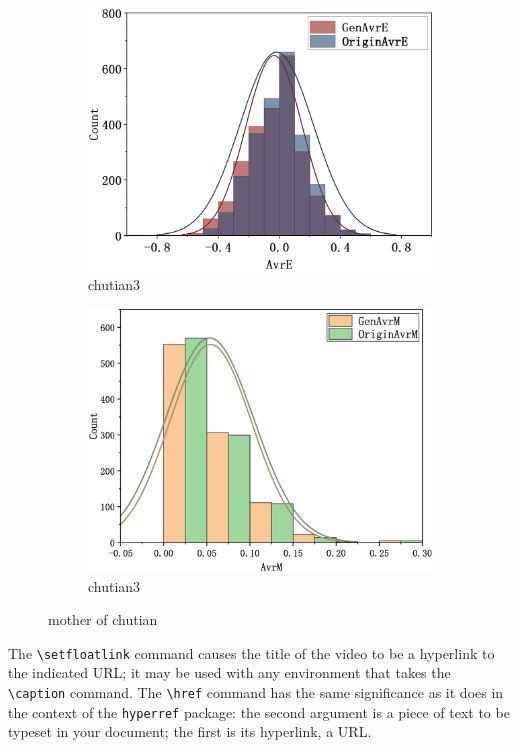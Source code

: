 \documentclass[%
reprint,
amsmath,amssymb,
aps,
]{revtex4-2}
\begin{document}
\begin{figure}[htbp]
\begin{subfigure}{0.4\linewidth}
	\end{subfigure}
	\centering
	\begin{subfigure}{0.4\linewidth}
		\centering
		\includegraphics[scale=0.1]{16mix32_16_T_3_E}
		\caption{chutian3}
		\label{chutian3}%
	\end{subfigure}
	\begin{subfigure}{0.4\linewidth}
		\centering
		\includegraphics[scale=0.1]{16mix32_16_M}
		\caption{chutian3}
		\label{chutian3}%
	\end{subfigure}

	\caption{mother of chutian}
	\label{da_chutian}
	\end{figure}
		The \verb+\setfloatlink+ command causes the title of the video to be a hyperlink to the
		indicated URL; it may be used with any environment that takes the \verb+\caption+
		command.
		The \verb+\href+ command has the same significance as it does in the context of
		the \texttt{hyperref} package: the second argument is a piece of text to be 
		typeset in your document; the first is its hyperlink, a URL.
		
\end{document}
